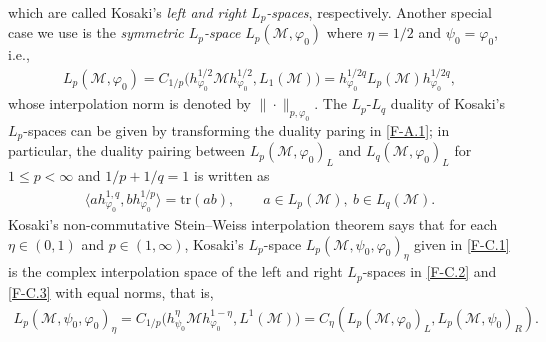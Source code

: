 \documentclass[12pt]{article}
\theoremstyle{definition}
\theoremstyle{remark}
\numberwithin{equation}{section}
\def\Me{\mathcal M}
\def\Tr{\mathrm{tr}}
\def\<{\langle}
\def\>{\rangle}
\def\ffi{\varphi}
\begin{document}
which are called Kosaki's \emph{left and right $L_p$-spaces}, respectively. {\color{red}Another special case
we use is the \emph{symmetric $L_p$-space} $L_p(\Me,\ffi_0)$ where $\eta=1/2$ and $\psi_0=\ffi_0$, i.e.,
\begin{align}\label{F-C.4}
L_p(\Me,\ffi_0)=C_{1/p}\bigl(h_{\ffi_0}^{1/2}\Me h_{\ffi_0}^{1/2},L_1(\Me)\bigr)
=h_{\ffi_0}^{1/2q}L_p(\Me)h_{\ffi_0}^{1/2q},
\end{align}
whose interpolation norm is denoted by $\|\cdot\|_{p,\ffi_0}$. The $L_p$-$L_q$ duality of Kosaki's
$L_p$-spaces can be given by transforming the duality paring in \eqref{F-A.1}; in particular,
the duality pairing between $L_p(\Me,\ffi_0)_L$ and $L_q(\Me,\ffi_0)_L$ for $1\le p<\infty$ and
$1/p+1/q=1$ is written as
\begin{align}\label{F-C.5}
\<ah_{\ffi_0}^{1,q},bh_{\ffi_0}^{1/p}\>=\Tr(ab),\qquad
a\in L_p(\Me),\ b\in L_q(\Me).
\end{align}}
Kosaki's non-commutative Stein--Weiss interpolation theorem \cite[Theorem 11.1]{kosaki1984applications}
says that for each $\eta\in(0,1)$ and $p\in(1,\infty)$, Kosaki's $L_p$-space $L_p(\Me,\psi_0,\ffi_0)_\eta$
given in \eqref{F-C.1} is the complex interpolation space of the left and right $L_p$-spaces in \eqref{F-C.2}
and \eqref{F-C.3} with equal norms, that is,
\begin{align}\label{F-C.6}
L_p(\Me,\psi_0,\ffi_0)_\eta
=C_{1/p}\bigl(h_{\psi_0}^\eta\Me h_{\ffi_0}^{1-\eta},L^1(\Me)\bigr)
=C_\eta(L_p(\Me,\ffi_0)_L,L_p(\Me,\psi_0)_R).
\end{align}

\end{document}
